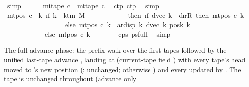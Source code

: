 \begin{isabellebody}
\ simp\isanewline
\ \ \ \ \isamarkupfalse%
\ {\isachardoublequoteopen}mt{\isacharunderscore}{\kern0pt}tape\ c{}\ {\isacharequal}{\kern0pt}\ mt{\isacharunderscore}{\kern0pt}tape\ c{}{\isachardoublequoteclose}\ \isamarkupfalse%
\ c{}{\isacharunderscore}{\kern0pt}tp\ c{}{\isacharunderscore}{\kern0pt}tp\ \isamarkupfalse%
\ simp\isanewline
\ \ \ \ \isamarkupfalse%
\ {\isachardoublequoteopen}mt{\isacharunderscore}{\kern0pt}pos\ c{}\ {\isacharequal}{\kern0pt}\ {\isacharparenleft}{\kern0pt}{\isasymlambda}k{\isachardot}{\kern0pt}\ if\ k\ {\isacharless}{\kern0pt}\ k{\isacharunderscore}{\kern0pt}tm\ M\isanewline
\ \ \ \ \ \ \ \ \ \ \ \ then\ {\isacharparenleft}{\kern0pt}if\ dvec\ k\ {\isacharequal}{\kern0pt}\ dir{\isachardot}{\kern0pt}R\ then\ mt{\isacharunderscore}{\kern0pt}pos\ c{}\ k\isanewline
\ \ \ \ \ \ \ \ \ \ \ \ \ \ \ \ \ \ else\ mt{\isacharunderscore}{\kern0pt}pos\ c{}\ k\ {\isacharminus}{\kern0pt}\ ar{\isacharunderscore}{\kern0pt}disp\ {\isacharquery}{\kern0pt}k\ {\isacharparenleft}{\kern0pt}dvec\ k{\isacharparenright}{\kern0pt}\ {\isacharparenleft}{\kern0pt}posk{}\ k{\isacharparenright}{\kern0pt}{\isacharparenright}{\kern0pt}\isanewline
\ \ \ \ \ \ \ \ \ \ \ \ else\ mt{\isacharunderscore}{\kern0pt}pos\ c{}\ k{\isacharparenright}{\kern0pt}{\isachardoublequoteclose}\isanewline
\ \ \ \ \ \ \isamarkupfalse%
\ c{}{\isacharunderscore}{\kern0pt}ps\ ps{\isacharunderscore}{\kern0pt}full\ \isamarkupfalse%
\ simp\isanewline
\ \ \isamarkupfalse%
\isanewline
{}\isamarkupfalse%
%
\endisatagproof
{\isafoldproof}%
%
\isadelimproof
%
\endisadelimproof
%
\begin{isamarkuptext}%
The full advance phase: the prefix walk over the first
   tapes followed by the unified last-tape advance
  , landing at 
  (current-tape field ) with every tape's head moved to
  's new position (: unchanged; otherwise
  ) and every  updated by
  .  The tape is unchanged throughout (advance only

\end{isamarkuptext}
\end{isabellebody}
